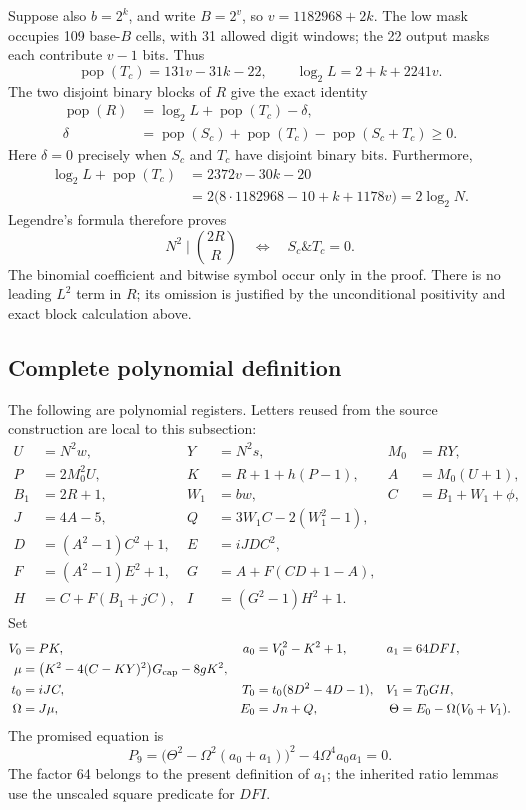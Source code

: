Suppose also $b=2^k$, and write $B=2^v$, so $v=1182968+2k$.
The low mask occupies 109 base-$B$ cells, with 31 allowed digit windows;
the 22 output masks each contribute $v-1$ bits. Thus
\[
 \operatorname{pop}(T_c)=131v-31k-22,
 \qquad \log_2L=2+k+2241v.
\]
The two disjoint binary blocks of $R$ give the exact identity
\begin{align*}
 \operatorname{pop}(R)
 &=\log_2L+\operatorname{pop}(T_c)-\delta,\\
 \delta&=\operatorname{pop}(S_c)+\operatorname{pop}(T_c)
                  -\operatorname{pop}(S_c+T_c)\geq0.
\end{align*}
Here $\delta=0$ precisely when $S_c$ and $T_c$ have disjoint binary bits.
Furthermore,
\begin{align*}
 \log_2L+\operatorname{pop}(T_c)
 &=2372v-30k-20\\
 &=2\bigl(8\cdot1182968-10+k+1178v\bigr)=2\log_2N.
\end{align*}
Legendre's formula therefore proves
\begin{equation}\label{eq:nine-threshold}
 N^2\mid\binom{2R}{R}
 \quad\Longleftrightarrow\quad S_c\mathbin{\&}T_c=0.
\end{equation}
The binomial coefficient and bitwise symbol occur only in the proof.
There is no leading $L^2$ term in $R$; its omission is justified by the
unconditional positivity and exact block calculation above.

\subsection{Complete polynomial definition}
The following are polynomial registers. Letters reused from the source
construction are local to this subsection:
\begin{align*}
 U&=N^2w,& Y&=N^2s,& M_0&=RY,\\
 P&=2M_0^2U,& K&=R+1+h(P-1),& A&=M_0(U+1),\\
 B_1&=2R+1,& W_1&=bw,& C&=B_1+W_1+\phi,\\
 J&=4A-5,& Q&=3W_1C-2(W_1^2-1),\\
 D&=(A^2-1)C^2+1,& E&=iJDC^2,\\
 F&=(A^2-1)E^2+1,& G&=A+F(CD+1-A),\\
 H&=C+F(B_1+jC),& I&=(G^2-1)H^2+1.
\end{align*}
Set
\begin{align*}
 V_0&=PK,& a_0&=V_0^2-K^2+1,& a_1&=64DFI,\\
 \mu&=\bigl(K^2-4(C-KY)^2\bigr)G_{\rm cap}-8gK^2,\\
 t_0&=iJC,& T_0&=t_0(8D^2-4D-1),& V_1&=T_0GH,\\
 \Omega&=J\mu,& E_0&=Jn+Q,&
 \Theta&=E_0-\Omega(V_0+V_1).
\end{align*}
The promised equation is
\begin{equation}\label{eq:nine-final}
 \boxed{\displaystyle
 P_9=\bigl(\Theta^2-\Omega^2(a_0+a_1)\bigr)^2
                  -4\Omega^4a_0a_1=0.}
\end{equation}
The factor 64 belongs to the present definition of $a_1$; the inherited
ratio lemmas use the unscaled square predicate for $DFI$.

